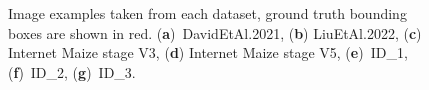 \documentclass[aspectratio=43]{beamer}
\begin{document}
\begin{frame}
\begin{figure}
  \caption{Image examples taken from each dataset, ground truth bounding boxes are shown  in red. %
    (\textbf{a})~DavidEtAl.2021, 
    (\textbf{b}) LiuEtAl.2022, 
    (\textbf{c}) Internet Maize stage V3,
    (\textbf{d}) Internet Maize stage V5,
    (\textbf{e})~ID\_1,
    (\textbf{f})~ID\_2,
    (\textbf{g})~ID\_3.}
\end{figure}
\end{frame}
\end{document}

